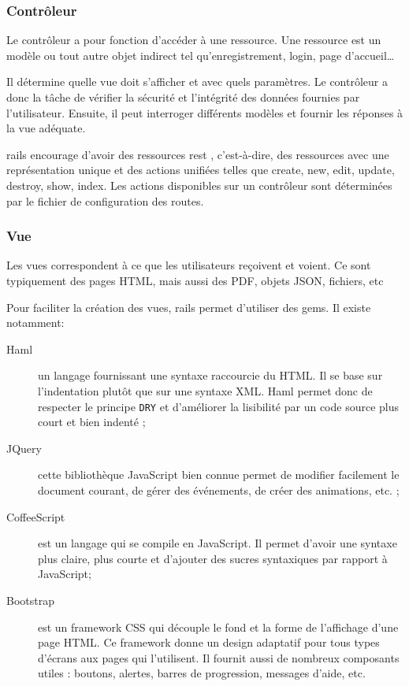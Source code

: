 \subsubsection{Contrôleur}
\label{controleur}
Le contrôleur a pour fonction d'accéder à une ressource. Une ressource est un modèle ou tout autre objet indirect tel qu’enregistrement, login, page d'accueil\ldots

Il détermine quelle vue doit s'afficher et avec quels paramètres. Le contrôleur a donc la tâche de vérifier la sécurité et l'intégrité des données fournies par l'utilisateur. Ensuite, il peut interroger différents modèles et fournir les réponses à la vue adéquate.

\label{rest}\label{rails-routes}
\gls{rails} encourage d'avoir des ressources \gls{rest} \cite{wiki-rest}, c'est-à-dire, des ressources avec une représentation unique et des actions unifiées telles que create, new, edit, update, destroy, show, index. Les actions disponibles sur un contrôleur sont déterminées par le fichier de configuration des routes.

\subsubsection{Vue}
Les vues correspondent à ce que les utilisateurs reçoivent et voient. Ce sont typiquement des pages HTML, mais aussi des PDF, objets JSON, fichiers, etc

Pour faciliter la création des vues, \gls{rails} permet d'utiliser des \glspl{gem}. Il existe notamment:
\begin{description}
  \item[Haml \cite{haml} \label{haml}] un langage fournissant une syntaxe raccourcie du HTML. Il se base sur l'indentation plutôt que sur une syntaxe XML. Haml permet donc de respecter le principe \texttt{DRY} et d'améliorer la lisibilité par un code source plus court et bien indenté ;
  \item[JQuery \cite{jquery}] cette bibliothèque JavaScript bien connue permet de modifier facilement le document courant, de gérer des événements, de créer des animations, etc. ;
  \item[CoffeeScript \cite{coffeescript}] est un langage qui se compile en JavaScript. Il permet d'avoir une syntaxe plus claire, plus courte et d'ajouter des sucres syntaxiques par rapport à JavaScript;
  \item[Bootstrap \cite{bootstrap}] est un framework CSS qui découple le fond et la forme de l'affichage d'une page HTML. Ce framework donne un design adaptatif pour tous types d'écrans aux pages qui l'utilisent. Il fournit aussi de nombreux composants utiles : boutons, alertes, barres de progression, messages d'aide, etc. \label{bootstrap}
\end{description}
